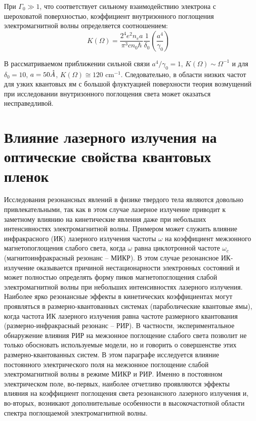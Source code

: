 При $\Gamma_0 \gg 1$, что соответствует сильному взаимодействию электрона с шероховатой поверхностью, коэффициент внутризонного поглощения электромагнитной волны определяется соотношением:
\begin{equation} \label{eq:21_40}
K(\Omega )=\frac{2^4 e^2 n_e a}{\pi^3 cn_0 \hbar } \frac{1}{\delta_0 } \left(\frac{a^4 }{\gamma_0 } \right)
\end{equation} 

В рассматриваемом приближении сильной связи $a^4 /\gamma_0 =1$, $K(\Omega )\sim \Omega ^{-1} $ и для $\delta_0 =10$, $a=50 \AA$, $K(\Omega )\cong 120 \text{ cm}^{-1} $. Следовательно, в области низких частот для узких квантовых ям с большой флуктуацией поверхности теория возмущений при исследовании внутризонного поглощения света может оказаться несправедливой.
	

\section{Влияние лазерного излучения на оптические свойства квантовых пленок} \label{sect2_2}

Исследования резонансных явлений в физике твердого тела являются довольно привлекательными, так как в этом случае лазерное излучение приводит к заметному влиянию на кинетические явления даже при небольших интенсивностях электромагнитной волны. Примером может служить влияние инфракрасного (ИК) лазерного излучения частоты $\omega $ на коэффициент межзонного магнетопоглощения слабого света, когда $\omega $ равна циклотронной частоте $\omega_c $ (магнитоинфракрасный резонанс -- МИКР). В этом случае резонансное ИК-излучение оказывается причиной нестационарности электронных состояний и может полностью определять форму пиков магнетопоглощения слабой электромагнитной волны при небольших интенсивностях лазерного излучения. Наиболее ярко резонансные эффекты в кинетических коэффициентах могут проявляться в размерно-квантованных системах (параболические квантовые ямы), когда частота ИК лазерного излучения равна частоте размерного квантования (размерно-инфракрасный резонанс -- РИР). В частности, экспериментальное обнаружение влияния РИР на межзонное поглощение слабого света позволит не только обосновать используемые модели, но и говорить о совершенстве этих размерно-квантованных систем. В этом параграфе исследуется влияние постоянного электрического поля на межзонное поглощение слабой электромагнитной волны в режиме МИКР и РИР. Именно в постоянном электрическом поле, во-первых, наиболее отчетливо проявляются эффекты влияния на коэффициент поглощения света резонансного лазерного излучения и, во-вторых, возникают дополнительные особенности в высокочастотной области спектра поглощаемой электромагнитной волны.

